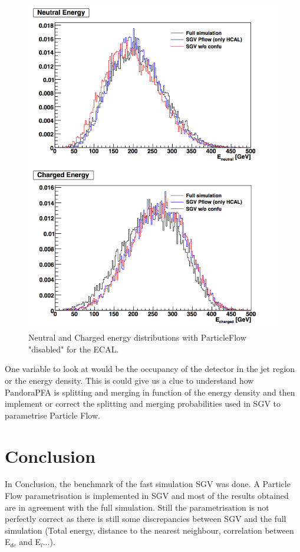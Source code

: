 \documentclass[a4paper,12pt]{article}
\begin{document}
\begin{figure}[!h]
   \centering
    \includegraphics[scale=0.5]{Total_EneuEcha_notjet_onlyHCAL.png}
      \caption{Neutral and Charged energy distributions with ParticleFlow "disabled" for the ECAL.}
   \label{fig:energy_ECALnoPFA}
\end{figure}

One variable to look at would be the occupancy of the detector in the jet region or the energy density. This is could give us a clue to understand how PandoraPFA is splitting and merging in function of the energy density and then implement or correct the splitting and merging probabilities used in SGV to parametrise Particle Flow.

\section{Conclusion}

In Conclusion, the benchmark of the fast simulation SGV was done. A Particle Flow parametrisation is implemented in SGV and most of the results obtained are in agreement with the full simulation. Still the parametrisation is not perfectly correct as there is still some discrepancies between SGV and the full simulation (Total energy, distance to the nearest neighbour, correlation between E$_{dc}$ and E$_l$...).
\end{document}

